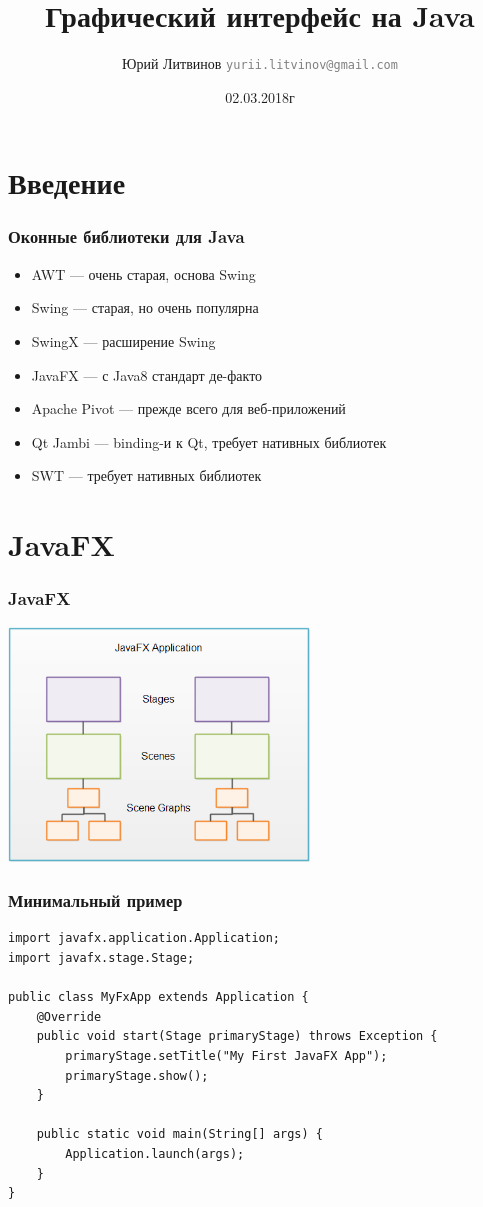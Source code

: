 \documentclass[xetex,mathserif,serif]{beamer}
\title{Графический интерфейс на Java}
\author[Юрий Литвинов]{Юрий Литвинов \newline \textcolor{gray}{\small\texttt{yurii.litvinov@gmail.com}}}
\date{02.03.2018г}
\begin{document}
	
	\frame{\titlepage}
	
	\section{Введение}

	\begin{frame}
		\frametitle{Оконные библиотеки для Java}
		\begin{itemize}
			\item AWT --- очень старая, основа Swing
			\item Swing --- старая, но очень популярна
			\item SwingX --- расширение Swing
			\item JavaFX --- с Java8 стандарт де-факто
			\item Apache Pivot --- прежде всего для веб-приложений
			\item Qt Jambi --- binding-и к Qt, требует нативных библиотек
			\item SWT --- требует нативных библиотек
		\end{itemize}
	\end{frame}

	\section{JavaFX}

	\begin{frame}
		\frametitle{JavaFX}
		\begin{center}
			\includegraphics[width=0.6\textwidth]{javaFxOverview.png}
		\end{center}
	\end{frame}

	\begin{frame}[fragile]
		\frametitle{Минимальный пример}
		\begin{verbatim}
import javafx.application.Application;
import javafx.stage.Stage;

public class MyFxApp extends Application {
    @Override
    public void start(Stage primaryStage) throws Exception {
        primaryStage.setTitle("My First JavaFX App");
        primaryStage.show();
    }
    
    public static void main(String[] args) {
        Application.launch(args);
    }
}
		\end{verbatim}
\end{frame}
\end{document}
